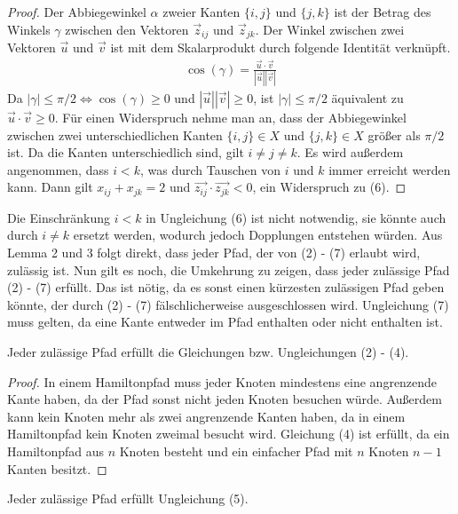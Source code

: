 \documentclass[a4paper, 10pt, ngerman]{article}
\begin{document}
\begin{proof}
    Der Abbiegewinkel $\alpha$ zweier Kanten $\{i, j\}$ und $\{j, k\}$ ist der Betrag des Winkels $\gamma$ zwischen den Vektoren $\vec z_{ij}$ und $\vec z_{jk}$. Der Winkel zwischen zwei Vektoren $\vec u$ und $\vec v$ ist mit dem Skalarprodukt durch folgende Identität verknüpft.
    \begin{align*}
        \cos(\gamma) = \frac {\vec{u} \cdot \vec{v}} {|\vec{u}||\vec{v}|}
    \end{align*}
    Da $|\gamma| \le \pi / 2 \Longleftrightarrow \cos(\gamma) \ge 0$ und $|\vec{u}| |\vec{v}| \ge 0$, ist $|\gamma| \le \pi / 2$ äquivalent zu $\vec{u} \cdot \vec{v} \ge 0$. Für einen Widerspruch nehme man an, dass der Abbiegewinkel zwischen zwei unterschiedlichen Kanten $\{i, j\} \in X$ und $\{j, k\} \in X$ größer als $\pi / 2$ ist. Da die Kanten unterschiedlich sind, gilt $i \ne j \ne k$. Es wird außerdem angenommen, dass $i < k$, was durch Tauschen von $i$ und $k$ immer erreicht werden kann. Dann gilt $x_{ij} + x_{jk} = 2$ und $\vec{z_{ij}} \cdot \vec{z_{jk}} < 0$, ein Widerspruch zu (6). 
\end{proof}

Die Einschränkung $i < k$ in Ungleichung (6) ist nicht notwendig, sie könnte auch durch $i \ne k$ ersetzt werden, wodurch jedoch Dopplungen entstehen würden. Aus Lemma 2 und 3 folgt direkt, dass jeder Pfad, der von (2) - (7) erlaubt wird, zulässig ist. Nun gilt es noch, die Umkehrung zu zeigen, dass jeder zulässige Pfad (2) - (7) erfüllt. Das ist nötig, da es sonst einen kürzesten zulässigen Pfad geben könnte, der durch (2) - (7) fälschlicherweise ausgeschlossen wird. Ungleichung (7) muss gelten, da eine Kante entweder im Pfad enthalten oder nicht enthalten ist.

\begin{lemma}
    Jeder zulässige Pfad erfüllt die Gleichungen bzw. Ungleichungen (2) - (4).
\end{lemma}

\begin{proof}
    In einem Hamiltonpfad muss jeder Knoten mindestens eine angrenzende Kante haben, da der Pfad sonst nicht jeden Knoten besuchen würde. Außerdem kann kein Knoten mehr als zwei angrenzende Kanten haben, da in einem Hamiltonpfad kein Knoten zweimal besucht wird. Gleichung (4) ist erfüllt, da ein Hamiltonpfad aus $n$ Knoten besteht und ein einfacher Pfad mit $n$ Knoten $n - 1$ Kanten besitzt.
\end{proof}

\begin{lemma}
    Jeder zulässige Pfad erfüllt Ungleichung (5).
\end{lemma}
\end{document}
